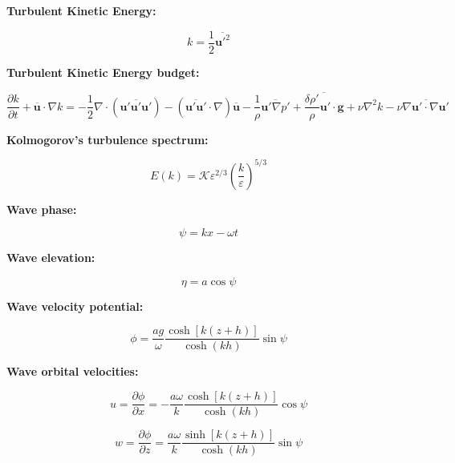 \documentclass[12pt]{article}
\numberwithin{equation}{section}
\numberwithin{figure}{section}
\numberwithin{table}{section}
\begin{document}
\textbf{Turbulent Kinetic Energy:}

\begin{equation}
  k = \frac{1}{2} \overline{\mathbf{u}'^2}
\end{equation}

\textbf{Turbulent Kinetic Energy budget:}

\begin{equation}
  \frac{\partial k}{\partial t} + \overline{\mathbf{u}} \cdot \nabla k =
  - \frac{1}{2} \nabla \cdot (\overline{\mathbf{u}' \mathbf{u}' \mathbf{u}'})
  - (\overline{\mathbf{u}' \mathbf{u}'} \cdot \nabla) \overline{\mathbf{u}}
  - \frac{1}{\rho} \overline{\mathbf{u}' \nabla p'}
  + \overline{\frac{\delta \rho'}{\rho} \mathbf{u}' \cdot \mathbf{g}}
  + \nu \nabla^2 k
  - \nu \overline{\nabla \mathbf{u}' \cdot \nabla \mathbf{u}'}
\end{equation}

\textbf{Kolmogorov's turbulence spectrum:}

\begin{equation}
  E(k) = \mathcal{K} \varepsilon^{2/3} \left( \frac{k}{\varepsilon} \right)^{5/3}
\end{equation}

\textbf{Wave phase:}

\begin{equation}
  \psi = kx - \omega t
\end{equation}

\textbf{Wave elevation:}

\begin{equation}
  \eta = a \cos\psi
\end{equation}

\textbf{Wave velocity potential:}

\begin{equation}
  \phi = \frac{a g}{\omega} \frac{\cosh[k(z + h)]}{\cosh(kh)} \sin\psi
\end{equation}

\textbf{Wave orbital velocities:}

\begin{equation}
  u = \frac{\partial \phi}{\partial x} = - \frac{a \omega}{k} \frac{\cosh[k(z + h)]}{\cosh(kh)} \cos\psi
\end{equation}

\begin{equation}
  w = \frac{\partial \phi}{\partial z} = \frac{a \omega}{k} \frac{\sinh[k(z + h)]}{\cosh(kh)} \sin\psi
\end{equation}
\end{document}
